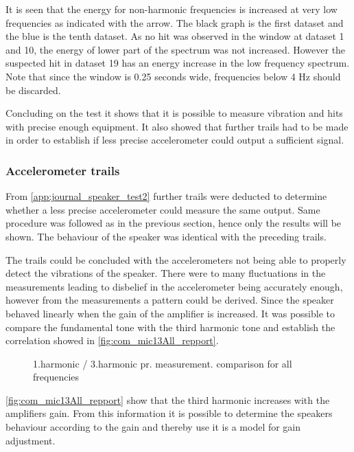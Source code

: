 
It is seen that the energy for non-harmonic frequencies is increased at very low frequencies as indicated with the arrow. The black graph is the first dataset and the blue is the tenth dataset. As no hit was observed in the window at dataset 1 and 10, the energy of lower part of the spectrum was not increased. However the suspected hit in dataset 19 has an energy increase in the low frequency spectrum. Note that since the window is 0.25 seconds wide, frequencies below 4 Hz should be discarded.

Concluding on the test it shows that it is possible to measure vibration and hits with precise enough equipment. It also showed that further trails had to be made in order to establish if less precise accelerometer could output a sufficient signal.

\subsubsection{Accelerometer trails}

From \autoref{app:journal_speaker_test2} further trails were deducted to determine whether a less precise accelerometer could measure the same output. Same procedure was followed as in the previous section, hence only the results will be shown. The behaviour of the speaker was identical with the preceding trails. 

The trails could be concluded with the accelerometers not being able to properly detect the vibrations of the speaker. There were to many fluctuations in the measurements leading to disbelief in the accelerometer being accurately enough, however from the measurements a pattern could be derived. Since the speaker behaved linearly when the gain of the amplifier is increased. It was possible to compare the fundamental tone with the third harmonic tone and establish the correlation showed in \autoref{fig:com_mic13All_repport}.

\begin{figure}[H]
    \centering
    
    \caption{1.harmonic / 3.harmonic pr. measurement. comparison for all frequencies}
\label{fig:com_mic13All_repport}
\end{figure}  

\autoref{fig:com_mic13All_repport} show that the third harmonic increases with the amplifiers gain. From this information it is possible to determine the speakers behaviour according to the gain and thereby use it is a model for gain adjustment.


